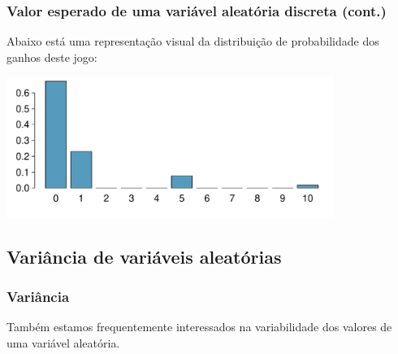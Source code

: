 \begin{frame}
\frametitle{Valor esperado de uma variável aleatória discreta (cont.)}
\justifying
Abaixo está uma representação visual da distribuição de probabilidade dos ganhos deste jogo:

\begin{center}
\includegraphics[width=0.8\textwidth]{2-4_random_variables/card_game.pdf}
\end{center}

\end{frame}


\subsection{Variância de variáveis aleatórias}


\begin{frame}
\frametitle{Variância}
\justifying
Também estamos frequentemente interessados na variabilidade dos valores de uma variável aleatória.

\formula{
\[ \sigma^2 = Var(X) = \sum_{i = 1}^k (x_i - E(X))^2 P(X = x_i) \]
\[ \sigma = SD(X) = \sqrt{Var(X)} \]
}

\end{frame}


